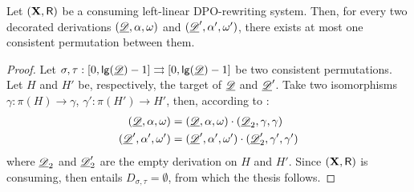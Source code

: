 \begin{corollary}\label{cor:unique}
Let $(\textbf {\textup{X}},\mathsf{R})$ be a consuming left-linear DPO-rewriting system. Then, for every two decorated derivations $(\underline{\mathscr{D}}, \alpha, \omega)$ and $(\underline{\mathscr{D}}', \alpha', \omega')$, there exists at most one consistent permutation between them.
\end{corollary}
\begin{proof}
Let $\sigma, \tau: [0, \mathsf{lg}(\underline{\mathscr{D}})-1]\rightrightarrows [0, \mathsf{lg}(\underline{\mathscr{D}})-1]$ be two consistent permutations. Let $H$  and $H'$ be, respectively, the target of $\underline{\mathscr{D}}$ and $\underline{\mathscr{D}}'$. Take two isomorphisms $\gamma:\pi(H)\to \gamma$, $\gamma':\pi(H')\to H'$, then, according to :
\begin{align*}(\underline{\mathscr{D}}, \alpha, \omega)&=(\underline{\mathscr{D}}, \alpha, \omega)\cdot (\underline{\mathscr{D}}_2, \gamma, \gamma) \\(\underline{\mathscr{D}}', \alpha', \omega')&=(\underline{\mathscr{D}}', \alpha', \omega')\cdot (\underline{\mathscr{D}}'_2, \gamma', \gamma') 
\end{align*} 
where $\underline{\mathscr{D}}_2$ and $\underline{\mathscr{D}}'_2$ are the empty derivation on $H$ and $H'$. Since $(\textbf {\textup{X}}, \mathsf{R})$ is consuming, then  entails $D_{\sigma, \tau}=\emptyset$, from which the thesis follows.
\end{proof}



